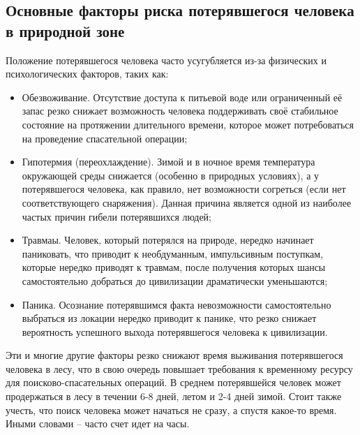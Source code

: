 \subsection{Основные факторы риска потерявшегося человека в природной зоне}

Положение потерявшегося человека часто усугубляется из-за физических и психологических факторов, таких как:

\begin{itemize}
    \item Обезвоживание. Отсутствие доступа к питьевой воде или ограниченный её запас резко снижает возможность человека поддерживать своё стабильное состояние на протяжении длительного времени, которое может потребоваться на проведение спасательной операции;
    \item Гипотермия (переохлаждение). Зимой и в ночное время температура окружающей среды снижается (особенно в природных условиях), а у потерявшегося человека, как правило, нет возможности согреться (если нет соответствующего снаряжения). Данная причина является одной из наиболее частых причин гибели потерявшихся людей;
    \item Травмаы. Человек, который потерялся на природе, нередко начинает паниковать, что приводит к необдуманным, импульсивным поступкам, которые нередко приводят к травмам, после получения которых шансы самостоятельно добраться до цивилизации драматически уменьшаются;
    \item Паника. Осознание потерявшимся факта невозможности самостоятельно выбраться из локации нередко приводит к панике, что резко снижает вероятность успешного выхода потерявшегося человека к цивилизации.
\end{itemize}

Эти и многие другие факторы резко снижают время выживания потерявшегося человека в лесу, что в свою очередь повышает требования к временному ресурсу для поисково-спасательных операций. В среднем потерявшейся человек может продержаться в лесу в течении 6-8 дней, летом и 2-4 дней зимой. Стоит также учесть, что поиск человека может начаться не сразу, а спустя какое-то время. Иными словами -- часто счет идет на часы.